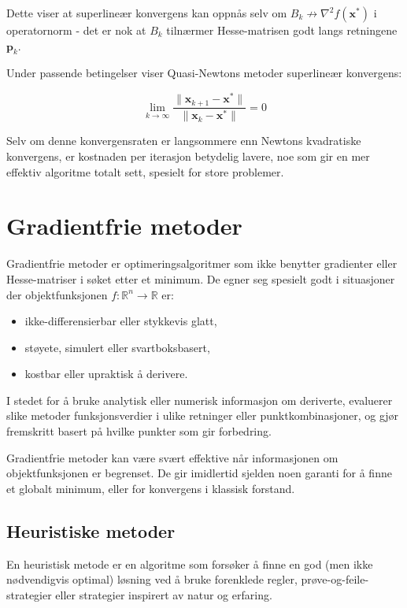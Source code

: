 Dette viser at superlineær konvergens kan oppnås selv om \( B_k \not\to \nabla^2 f(\symbf{x}^\ast) \) i operatornorm - det er nok at \( B_k \) tilnærmer Hesse-matrisen godt langs retningene \( \symbf{p}_k \).

Under passende betingelser viser Quasi-Newtons metoder superlineær konvergens:

\[
	\lim_{k \to \infty} \frac{\|\symbf{x}_{k+1} - \symbf{x}^\ast\|}{\|\symbf{x}_k - \symbf{x}^\ast\|} = 0
\]

Selv om denne konvergensraten er langsommere enn Newtons kvadratiske konvergens, er kostnaden per iterasjon betydelig lavere, noe som gir en mer effektiv algoritme totalt sett, spesielt for store problemer.

\section{Gradientfrie metoder}
\label{sec:gradientfrie_metoder}

Gradientfrie metoder er optimeringsalgoritmer som ikke benytter gradienter eller Hesse-matriser i søket etter et minimum.
De egner seg spesielt godt i situasjoner der objektfunksjonen \( f : \mathbb{R}^n \to \mathbb{R} \) er:
\begin{itemize}
	\item ikke-differensierbar eller stykkevis glatt,
	\item støyete, simulert eller svartboksbasert,
	\item kostbar eller upraktisk å derivere.
\end{itemize}

I stedet for å bruke analytisk eller numerisk informasjon om deriverte, evaluerer slike metoder funksjonsverdier i ulike retninger eller punktkombinasjoner, og gjør fremskritt basert på hvilke punkter som gir forbedring.

Gradientfrie metoder kan være svært effektive når informasjonen om objektfunksjonen er begrenset. De gir imidlertid sjelden noen garanti for å finne et globalt minimum, eller for konvergens i klassisk forstand.

\subsection{Heuristiske metoder}

En heuristisk metode er en algoritme som forsøker å finne en god (men ikke nødvendigvis optimal) løsning ved å bruke forenklede regler, prøve-og-feile-strategier eller strategier inspirert av natur og erfaring.

